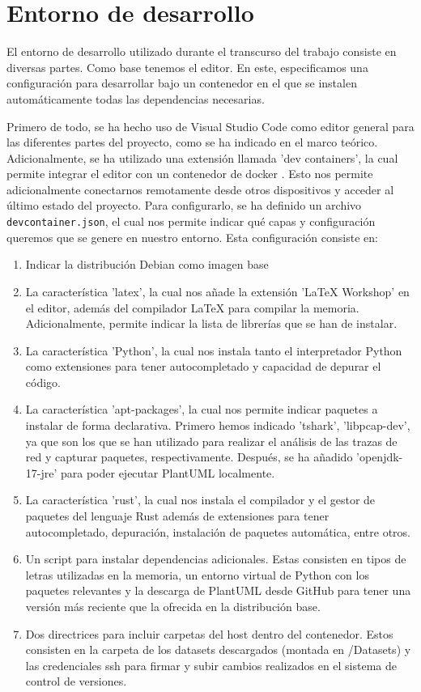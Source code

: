 \section{Entorno de desarrollo}

El entorno de desarrollo utilizado durante el transcurso del trabajo consiste en diversas partes. Como base tenemos el editor. En este, especificamos una configuración para desarrollar bajo un contenedor en el que se instalen automáticamente todas las dependencias necesarias.

Primero de todo, se ha hecho uso de Visual Studio Code como editor general para las diferentes partes del proyecto, como se ha indicado en el marco teórico. Adicionalmente, se ha utilizado una extensión llamada 'dev containers', la cual permite integrar el editor con un contenedor de docker \cite{devcontainers}. Esto nos permite adicionalmente conectarnos remotamente desde otros dispositivos y acceder al último estado del proyecto. Para configurarlo, se ha definido un archivo \texttt{devcontainer.json}, el cual nos permite indicar qué capas y configuración queremos que se genere en nuestro entorno. Esta configuración consiste en:

\begin{enumerate}
    \item Indicar la distribución Debian como imagen base
    \item La característica 'latex', la cual nos añade la extensión 'LaTeX Workshop' en el editor, además del compilador LaTeX para compilar la memoria. Adicionalmente, permite indicar la lista de librerías que se han de instalar.
    \item La característica 'Python', la cual nos instala tanto el interpretador Python como extensiones para tener autocompletado y capacidad de depurar el código.
    \item La característica 'apt-packages', la cual nos permite indicar paquetes a instalar de forma declarativa. Primero hemos indicado 'tshark', 'libpcap-dev', ya que son los que se han utilizado para realizar el análisis de las trazas de red y capturar paquetes, respectivamente. Después, se ha añadido 'openjdk-17-jre' para poder ejecutar PlantUML localmente.
    \item La característica 'rust', la cual nos instala el compilador y el gestor de paquetes del lenguaje Rust además de extensiones para tener autocompletado, depuración, instalación de paquetes automática, entre otros.
    \item Un script para instalar dependencias adicionales. Estas consisten en tipos de letras utilizadas en la memoria, un entorno virtual de Python con los paquetes relevantes y la descarga de PlantUML desde GitHub para tener una versión más reciente que la ofrecida en la distribución base.
    \item Dos directrices para incluir carpetas del host dentro del contenedor. Estos consisten en la carpeta de los datasets descargados (montada en /Datasets) y las credenciales \acrshort{ssh} para firmar y subir cambios realizados en el sistema de control de versiones.
\end{enumerate}

